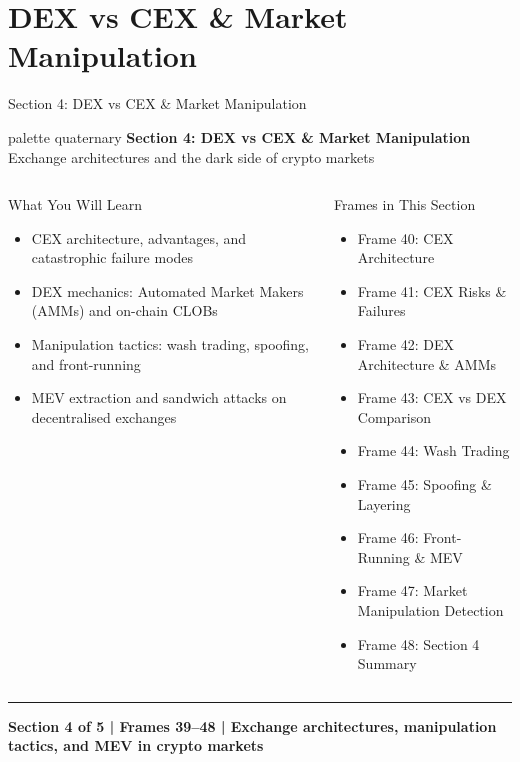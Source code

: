 \documentclass[8pt,aspectratio=169]{beamer}
\newcommand{\bottomnote}[1]{\vfill\vspace{-2mm}\textcolor{mllavender2}{\rule{\textwidth}{0.4pt}}\vspace{1mm}\footnotesize\textbf{#1}}
\begin{document}
\section{DEX vs CEX \& Market Manipulation}

\begin{frame}{Section 4: DEX vs CEX \& Market Manipulation}
\begin{beamercolorbox}[sep=12pt,center,rounded=true,shadow=true]{palette quaternary}
  {\Large\bfseries Section 4: DEX vs CEX \& Market Manipulation}\\[4pt]
  {\normalsize Exchange architectures and the dark side of crypto markets}
\end{beamercolorbox}

\vspace{4mm}
\begin{columns}[T]
\begin{block}{What You Will Learn}
\begin{itemize}\setlength{\itemsep}{2pt}
  \item CEX architecture, advantages, and catastrophic failure modes
  \item DEX mechanics: Automated Market Makers (AMMs) and on-chain CLOBs
  \item Manipulation tactics: wash trading, spoofing, and front-running
  \item MEV extraction and sandwich attacks on decentralised exchanges
\end{itemize}
\end{block}
\begin{block}{Frames in This Section}
\begin{itemize}\setlength{\itemsep}{2pt}
  \item Frame 40: CEX Architecture
  \item Frame 41: CEX Risks \& Failures
  \item Frame 42: DEX Architecture \& AMMs
  \item Frame 43: CEX vs DEX Comparison
  \item Frame 44: Wash Trading
  \item Frame 45: Spoofing \& Layering
  \item Frame 46: Front-Running \& MEV
  \item Frame 47: Market Manipulation Detection
  \item Frame 48: Section 4 Summary
\end{itemize}
\end{block}
\end{columns}
\bottomnote{Section 4 of 5 | Frames 39--48 | Exchange architectures, manipulation tactics, and MEV in crypto markets}
\end{frame}
\end{document}

